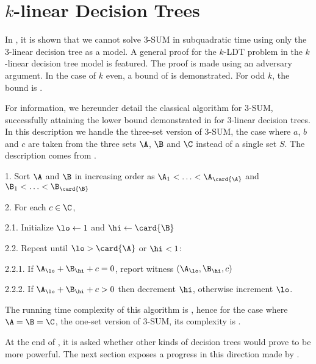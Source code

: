 \section{$k$-linear Decision Trees}

In \cite{erickson:1999}, it is shown that we cannot solve $3$-SUM in
subquadratic time using only the $3$-linear decision tree as a model. A
general proof for the $k$-LDT problem in the $k$-linear decision tree model
is featured. The proof is made using an adversary argument. In the case of $k$
even, a bound of  is demonstrated. For odd $k$, the
bound is .

For information, we hereunder detail the classical  algorithm for
$3$-SUM, successfully attaining the lower bound demonstrated in
\cite{erickson:1999} for $3$-linear decision trees. In this description we
handle the three-set version of $3$-SUM, \ie the case where $a$, $b$ and $c$
are taken from the three sets $\A$, $\B$ and $\C$ instead of a single set $S$.
The description comes from \cite{gronlund:2014}.


\begin{algorithm}
\item[1.] Sort $\A$ and $\B$ in increasing order as $\A_1 < \ldots <
\A_{\card{\A}}$ and $\B_1 < \ldots < \B_{\card{\B}}$
\item[2.] For each $c \in \C$,
\item[2.1.] Initialize $\lo \gets 1$ and $\hi \gets \card{\B}$
\item[2.2.] Repeat until $\lo > \card{\A}$ or $\hi < 1$:
\item[2.2.1.] If $\A_{\lo} + \B_{\hi} + c = 0$, report witness $(\A_{\lo},
\B_{\hi}, c)$
\item[2.2.2.] If $\A_{\lo} + \B_{\hi} + c > 0$ then decrement $\hi$, otherwise
increment $\lo$.
\end{algorithm}


The running time complexity of this algorithm is
\BigO{\card{\C}(\card{\A}+\card{\B})}, hence for the case where
$\A = \B = \C$, \ie the one-set version of $3$-SUM, its complexity is
.

At the end of \cite{erickson:1999}, it is asked whether other kinds of
decision trees would prove to be more powerful. The next section exposes a
progress in this direction made by \cite{ailon:2005}.
